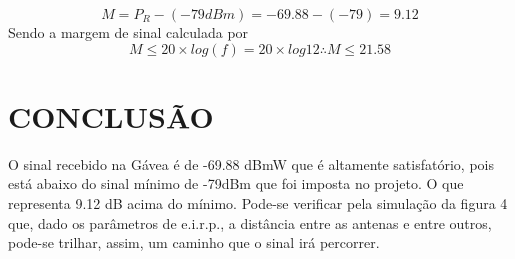 \documentclass[a4paper,12pt]{article}
\begin{document}
\begin{equation}
 M = P_R - (-79dBm) = -69.88 - (-79) = 9.12
\end{equation}
Sendo a margem de sinal calculada por 
\begin{equation}
 M \leq 20 \times log (f) = 20 \times log 12 \therefore M \leq 21.58
\end{equation}

 
\section{CONCLUSÃO} 
O sinal recebido na Gávea é de -69.88 dBmW que é altamente satisfatório,
pois está abaixo do sinal mínimo de -79dBm que foi imposta no projeto. O que
representa 9.12 dB acima do mínimo.
Pode-se verificar pela simulação da figura 4 que, dado os parâmetros de
e.i.r.p., a distância entre as antenas e entre outros, pode-se trilhar, assim, um
caminho que o sinal irá percorrer.
 
 
 
 
\end{document}
